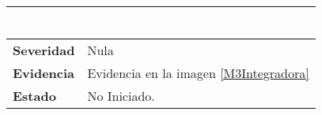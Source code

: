 \begin{longtable}{|p{4cm}|p{9.5cm}|}
\begin{tabular}[c]{@{}l@{}}
\end{tabular}                                                                                                                                                                                                                                                                                                                     \\ 
\hline
\textbf{Severidad}                                                                              &    Nula                                                                                                                                                                                                                                                                                                                   \\ 
\hline
\textbf{Evidencia}                                                                              &     Evidencia en la imagen \ref{M3Integradora}                                                                                                                                                                                                                                                                                                                 \\ 
\hline
\textbf{Estado}                                                                                 & No Iniciado.                                                                                                                                                                                                                                                                                                          \\
\hline
\end{longtable}
